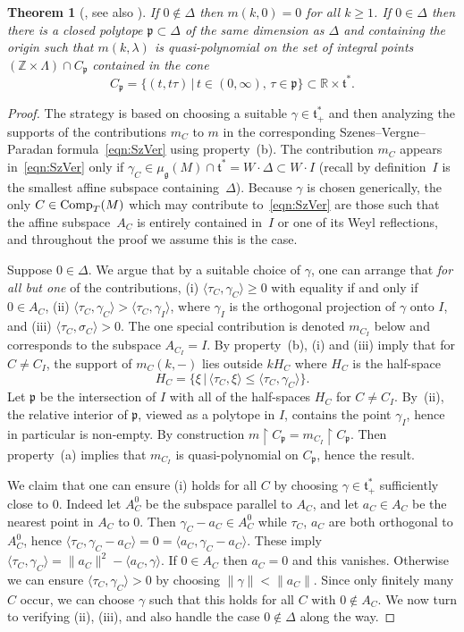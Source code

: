 \documentclass[pdftex]{sigma}
\numberwithin{equation}{section}
\newtheorem{Theorem}{Theorem}[section]
\newcommand{\pair}[2]{\langle #1, #2 \rangle}
\newcommand{\tn}[1]{\textnormal{#1}}
\def\g{\ensuremath{\mathfrak{g}}}
\def\t{\ensuremath{\mathfrak{t}}}
\def\p{\ensuremath{\mathfrak{p}}}
\def\bR{\ensuremath{\mathbb{R}}}
\def\bZ{\ensuremath{\mathbb{Z}}}
\begin{document}
\begin{Theorem}[\cite{MeinrenkenSjamaar}, see also \cite{ParadanRiemannRoch, ParadanWallCrossing, WittenNonAbelian}]\label{thm:qp}
If $0 \notin \Delta$ then $m(k,0)=0$ for all $k \ge 1$. If $0 \in \Delta$ then there is a closed polytope $\p \subset \Delta$ of the same dimension as $\Delta$ and containing the origin such that $m(k,\lambda)$ is quasi-polynomial on the set of integral points $(\bZ \times \Lambda) \cap C_\p$ contained in the cone
\[ C_\p=\{(t,t\tau)\,|\,t \in (0,\infty), \,\tau \in \p \} \subset \bR \times \t^\ast.\]
\end{Theorem}
\begin{proof}The strategy is based on choosing a suitable $\gamma \in \t^\ast_+$ and then analyzing the supports of the contributions $m_C$ to $m$ in the corresponding Szenes--Vergne--Paradan formula~\eqref{eqn:SzVer} using property~(b). The contribution $m_C$ appears in~\eqref{eqn:SzVer} only if $\gamma_C \in \mu_\g(M)\cap \t^\ast=W \cdot \Delta \subset W \cdot I$ (recall by definition~$I$ is the smallest affine subspace containing~$\Delta$). Because $\gamma$ is chosen generically, the only $C \in \tn{Comp}_T(M)$ which may contribute to~\eqref{eqn:SzVer} are those such that the affine subspace~$A_C$ is entirely contained in~$I$ or one of its Weyl reflections, and throughout the proof we assume this is the case.

Suppose $0 \in \Delta$. We argue that by a suitable choice of $\gamma$, one can arrange that \emph{for all but one} of the contributions, (i) $\pair{\tau_C}{\gamma_C}\ge 0$ with equality if and only if $0 \in A_C$, (ii) $\pair{\tau_C}{\gamma_C}>\pair{\tau_C}{\gamma_I}$, where $\gamma_I$ is the orthogonal projection of $\gamma$ onto $I$, and (iii) $\pair{\tau_C}{\sigma_C}>0$. The one special contribution is denoted $m_{C_I}$ below and corresponds to the subspace $A_{C_I}=I$. By property~(b), (i) and (iii) imply that for $C \ne C_I$, the support of $m_C(k,-)$ lies outside $kH_C$ where $H_C$ is the half-space
\[ H_C=\{\xi \,|\, \pair{\tau_C}{\xi}\le \pair{\tau_C}{\gamma_C}\}.\]
Let $\p$ be the intersection of $I$ with all of the half-spaces $H_C$ for $C \ne C_I$. By~(ii), the relative interior of $\p$, viewed as a polytope in $I$, contains the point $\gamma_I$, hence in particular is non-empty. By construction $m\upharpoonright C_\p=m_{C_I}\upharpoonright C_\p$. Then property~(a) implies that $m_{C_I}$ is quasi-polynomial on $C_\p$, hence the result.

We claim that one can ensure (i) holds for all $C$ by choosing $\gamma \in \t^\ast_+$ sufficiently close to $0$. Indeed let $A_C^0$ be the subspace parallel to $A_C$, and let $a_C \in A_C$ be the nearest point in $A_C$ to $0$. Then $\gamma_C-a_C \in A_C^0$ while $\tau_C$, $a_C$ are both orthogonal to $A_C^0$, hence $\pair{\tau_C}{\gamma_C-a_C}=0=\pair{a_C}{\gamma_C-a_C}$. These imply $\pair{\tau_C}{\gamma_C}=\|a_C\|^2-\pair{a_C}{\gamma}$. If $0 \in A_C$ then $a_C=0$ and this vanishes. Otherwise we can ensure $\pair{\tau_C}{\gamma_C}>0$ by choosing $\|\gamma\|<\|a_C\|$. Since only finitely many $C$ occur, we can choose $\gamma$ such that this holds for all $C$ with $0 \notin A_C$. We now turn to verifying (ii), (iii), and also handle the case $0 \notin \Delta$ along the way.


\end{proof}
\end{document}
